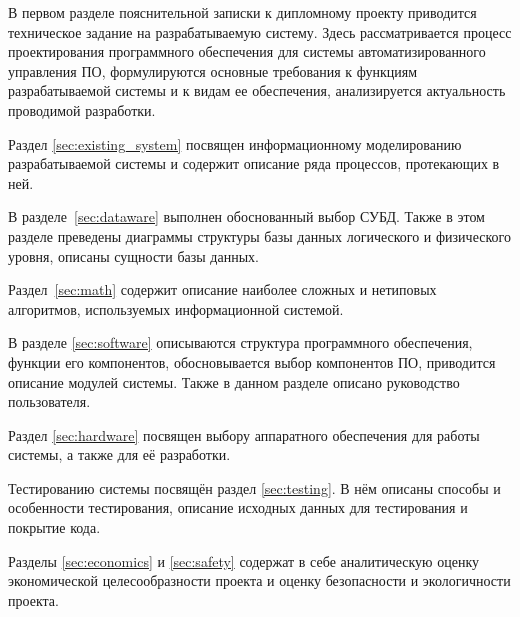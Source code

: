 В первом разделе пояснительной записки к дипломному проекту приводится техническое задание на разрабатываемую систему. Здесь рассматривается процесс проектирования программного обеспечения для системы автоматизированного управления ПО, формулируются основные требования к функциям разрабатываемой системы и к видам ее обеспечения, анализируется актуальность проводимой разработки.

Раздел \ref{sec:existing_system} посвящен информационному моделированию разрабатываемой системы и содержит описание ряда процессов, протекающих в ней.

В разделе~\ref{sec:dataware} выполнен обоснованный выбор СУБД. Также в этом разделе преведены диаграммы структуры базы данных логического и физического уровня, описаны сущности базы данных.

Раздел~\ref{sec:math} содержит описание наиболее сложных и нетиповых алгоритмов, используемых информационной системой.

В разделе \ref{sec:software} описываются структура программного обеспечения, функции его компонентов, обосновывается выбор компонентов ПО, приводится описание модулей системы. Также в данном разделе описано руководство пользователя.

Раздел \ref{sec:hardware} посвящен выбору аппаратного обеспечения для работы системы, а также для её разработки.

Тестированию системы посвящён раздел \ref{sec:testing}. В нём описаны способы и особенности тестирования, описание исходных данных для тестирования и покрытие кода.

Разделы \ref{sec:economics} и \ref{sec:safety} содержат в себе аналитическую оценку экономической целесообразности проекта и оценку безопасности и экологичности проекта.
